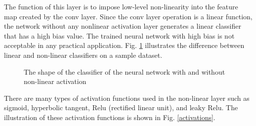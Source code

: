 The function of this layer is to impose low-level non-linearity into the feature map created by the conv layer. Since the conv layer operation is a linear function, the network without any nonlinear activation layer generates a linear classifier that has a high bias value. The trained neural network with high bias is not acceptable in any practical application. Fig. \ref{activation} illustrates the difference between linear and non-linear classifiers on a sample dataset. 

\begin{figure}
    \centering
    \caption{The shape of the classifier of the neural network with and without non-linear activation \cite{coursera1}}
    \label{activation}
\end{figure} 

There are many types of activation functions used in the non-linear layer such as sigmoid, hyperbolic tangent, Relu (rectified linear unit), and leaky Relu. The illustration of these activation functions is shown in Fig. \ref{activations}. 

